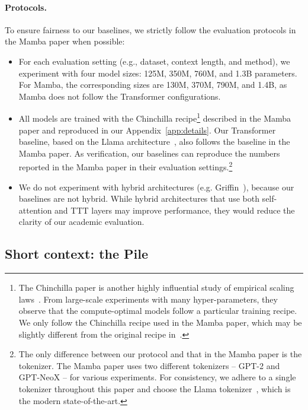 \documentclass{article}
\begin{document}
\paragraph{Protocols.}
To ensure fairness to our baselines, we strictly follow the evaluation protocols in the Mamba paper when possible:
\begin{itemize}[leftmargin=*]
    \item For each evaluation setting (e.g., dataset, context length, and method), we experiment with four model sizes: 125M, 350M, 760M, and 1.3B parameters. For Mamba, the corresponding sizes are 130M, 370M, 790M, and 1.4B, as Mamba does not follow the Transformer configurations.
    \item All models are trained with the Chinchilla recipe\footnote{\label{footnote:10}
    The Chinchilla paper is another highly influential study of empirical scaling laws~\cite{hoffmann2022training}.
    From large-scale experiments with many hyper-parameters, they observe that the compute-optimal models follow a particular training recipe.
    We only follow the Chinchilla recipe used in the Mamba paper, which may be slightly different from the original recipe in~\cite{hoffmann2022training}.
    } described in the Mamba paper and reproduced in our Appendix~\ref{app:details}.
    Our Transformer baseline, based on the Llama architecture~\cite{touvron2023llama}, also follows the baseline in the Mamba paper.
    As verification, our baselines can reproduce the numbers reported in the Mamba paper in their evaluation settings.\footnote{\label{foot:tokenizer}
    The only difference between our protocol and that in the Mamba paper is the tokenizer.
    The Mamba paper uses two different tokenizers -- GPT-2 and GPT-NeoX -- for various experiments. 
    For consistency, we adhere to a single tokenizer throughout this paper and choose the Llama tokenizer~\cite{touvron2023llama}, which is the modern state-of-the-art.
    }    
    \item We do not experiment with hybrid architectures (e.g. Griffin~\cite{de2024griffin}), because our baselines are not hybrid.
    While hybrid architectures that use both self-attention and TTT layers may improve performance, they would reduce the clarity of our academic evaluation.
\end{itemize}

\subsection{Short context: the Pile}
\label{subsec:pile}
\end{document}
